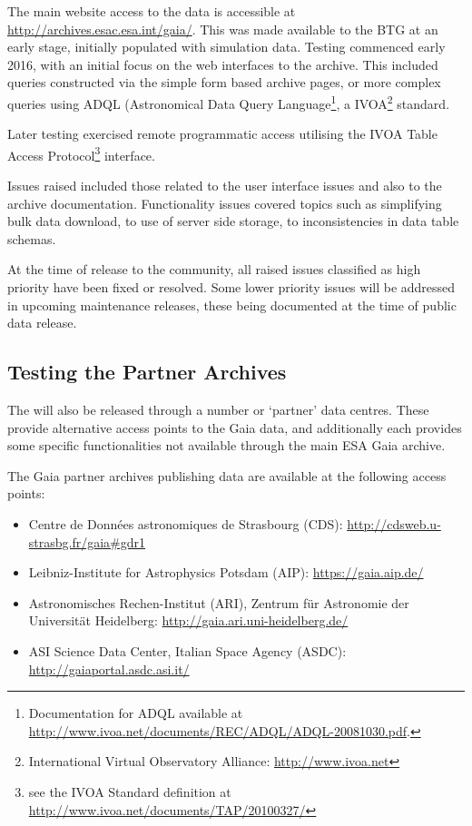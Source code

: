 The main website access to the {}  data is accessible at {\small\url{http://archives.esac.esa.int/gaia/}}. This was made available to the BTG at an early stage, initially populated with simulation data. Testing commenced early 2016, with an initial focus on the web interfaces to the archive. This included queries constructed via the simple form based archive pages, or more complex queries using ADQL (Astronomical Data Query Language\footnote{Documentation for ADQL available at {\scriptsize\url{http://www.ivoa.net/documents/REC/ADQL/ADQL-20081030.pdf}.}}, a IVOA\footnote{International Virtual Observatory Alliance: {\scriptsize\url{http://www.ivoa.net}}} standard. 

Later testing exercised remote programmatic access utilising the IVOA Table Access Protocol\footnote{see the IVOA Standard definition at {\scriptsize\url{http://www.ivoa.net/documents/TAP/20100327/}}} interface. 

Issues raised included those related to the user interface issues and also to the archive documentation. Functionality issues covered topics such as simplifying bulk data download, to use of server side storage, to inconsistencies in data table schemas. 

At the time of {} release to the community, all raised issues classified as high priority have been fixed or resolved. Some lower priority issues will be addressed in upcoming maintenance releases, these being documented at the time of public data release. 

\subsection{Testing the {}  Partner Archives}\label{sec:wp910:partner}

The {} will also be released through a number or `partner' data centres. These provide alternative access points to the Gaia data, and additionally each provides some specific functionalities not available through the main ESA Gaia archive. 

The Gaia partner archives publishing {} data are available at the following access points:

\begin{itemize}
\item Centre de Donn\'{e}es astronomiques de Strasbourg (CDS): {\small\url{http://cdsweb.u-strasbg.fr/gaia#gdr1}}
\item Leibniz-Institute for Astrophysics Potsdam (AIP): {\small\url{https://gaia.aip.de/}}
\item Astronomisches Rechen-Institut (ARI),  Zentrum f\"{u}r Astronomie der Universit\"{a}t Heidelberg: {\small\url{http://gaia.ari.uni-heidelberg.de/}}
\item ASI Science Data Center, Italian Space Agency  (ASDC): {\small\url{http://gaiaportal.asdc.asi.it/}}
\end{itemize}

